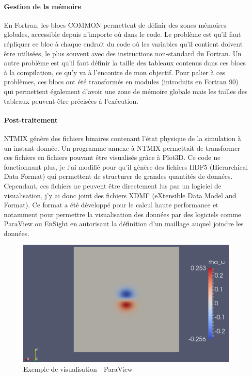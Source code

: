 
\paragraph{Gestion de la mémoire}En Fortran, les blocs COMMON permettent de définir des zones mémoires globales, accessible depuis n'importe où dans le code. Le problème est qu'il faut répliquer ce bloc à chaque endroit du code où les variables qu'il contient doivent être utilisées, le plus souvent avec des instructions non-standard du Fortran. Un autre problème est qu'il faut définir la taille des tableaux contenus dans ces blocs à la compilation, ce qu'y va à l'encontre de mon objectif. Pour palier à ces problèmes, ces blocs ont été transformés en modules (introduits en Fortran 90) qui permettent également d'avoir une zone de mémoire globale mais les tailles des tableaux peuvent être précisées à l'exécution.

\paragraph{Post-traitement}NTMIX génère des fichiers binaires contenant l'état physique de la simulation à un instant donnée. Un programme annexe à NTMIX permettait de transformer ces fichiers en fichiers pouvant être visualisés grâce à Plot3D. Ce code ne fonctionnant plus, je l'ai modifié pour qu'il génère des fichiers HDF5 (Hierarchical Data Format) qui permettent de structurer de grandes quantités de données. Cependant, ces fichiers ne peuvent être directement lus par un logiciel de visualisation, j'y ai donc joint des fichiers XDMF (eXtensible Data Model and Format). Ce format a été développé pour le calcul haute performance et notamment pour permettre la visualisation des données par des logiciels comme ParaView ou EnSight en autorisant la définition d'un maillage auquel joindre les données.


\begin{figure}[ht]
  \centering
  \includegraphics[scale=0.3]{figures/vertex.png}
  \caption{\label{fig:visu}Exemple de visualisation - ParaView}
\end{figure}

